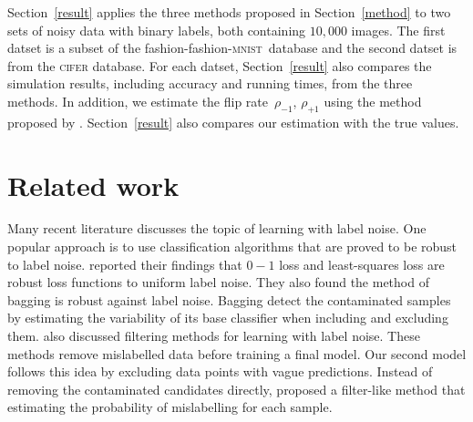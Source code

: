 \documentclass[12pt]{article} %
\newcommand{\rhoo}{\rho_{+1}}
\newcommand{\rhoz}{\rho_{-1}}
\newcommand{\mnist}{fashion-\textsc{mnist}\ }
\begin{document}
Section~\ref{result} applies the three methods proposed in Section~\ref{method} to two sets of noisy data with binary labels, both containing $10,000$ images. The first datset is a subset of the fashion-\mnist database and the second datset is from the \textsc{cifer} database. For each datset, Section~\ref{result} also compares the simulation results, including accuracy and running times, from the three methods. In addition, we estimate the flip rate~$\rhoz$, $\rhoo$ using the method proposed by \citet{liu2016classification}.
Section~\ref{result} also compares our estimation with the true values.

\section{Related work}
Many recent literature discusses the topic of learning with label noise. One popular approach is to use classification algorithms that are proved to be robust to label noise. \citet{frenay2014classification} reported their findings that $0-1$ loss and least-squares loss are robust loss functions to uniform label noise. %
They also found the method of bagging is robust against label noise. Bagging detect the contaminated samples by estimating the variability of its base classifier when including and excluding them. %
\citet{frenay2014classification} also discussed filtering methods for learning with label noise. These methods remove mislabelled data before training a final model. Our second model follows this idea by excluding data points with vague predictions. Instead of removing the contaminated candidates directly, \citet{yang2018adasampling} proposed a filter-like method that estimating the probability of mislabelling for each sample.
\end{document}
